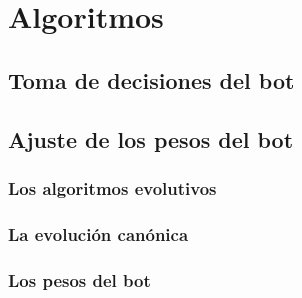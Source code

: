 \chapter{Algoritmos}


\section{Toma de decisiones del bot}


\section{Ajuste de los pesos del bot}


\subsection{Los algoritmos evolutivos}


\subsection{La evolución canónica}


\subsection{Los pesos del bot}